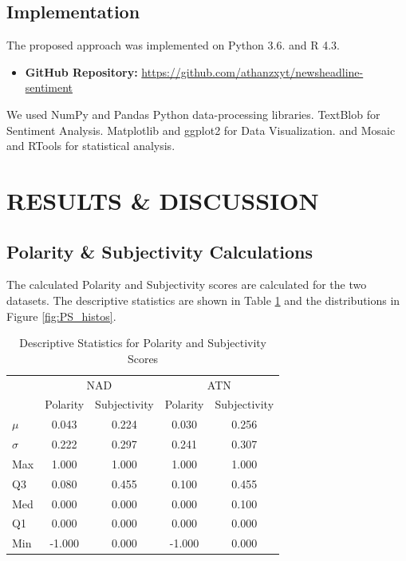 \documentclass[12pt]{article}
\begin{document}
\subsection{Implementation}

The proposed approach was implemented on Python 3.6. and R 4.3.

\begin{itemize}
    \item \textbf{GitHub Repository:} 
    \newline
    \url{https://github.com/athanzxyt/newsheadline-sentiment}
\end{itemize}

We used NumPy and Pandas Python data-processing libraries. TextBlob for Sentiment Analysis. Matplotlib and ggplot2 for Data Visualization. and Mosaic and RTools for statistical analysis.

\section{RESULTS \& DISCUSSION}

\subsection{Polarity \& Subjectivity Calculations}

The calculated Polarity and Subjectivity scores are calculated for the two datasets. The descriptive statistics are shown in Table \ref{lab:desc_stats} and the distributions in Figure \ref{fig:PS_histos}. 

\begin{table}[H]
    \centering
    \begin{tabular}{lcccc}
    \hline
                             & \multicolumn{2}{c}{NAD} & \multicolumn{2}{c}{ATN} \\
                             & Polarity & Subjectivity & Polarity & Subjectivity \\ \hline
    \multicolumn{1}{l|}{$\mu$}  & 0.043    & 0.224 & 0.030    & 0.256 \\
    \multicolumn{1}{l|}{$\sigma$}  & 0.222    & 0.297 & 0.241    & 0.307 \\
    \multicolumn{1}{l|}{Max} & 1.000    & 1.000 & 1.000    & 1.000 \\
    \multicolumn{1}{l|}{Q3}  & 0.080    & 0.455 & 0.100    & 0.455 \\
    \multicolumn{1}{l|}{Med} & 0.000   & 0.000 & 0.000    & 0.100 \\
    \multicolumn{1}{l|}{Q1}  & 0.000   & 0.000 & 0.000    & 0.000 \\
    \multicolumn{1}{l|}{Min} & -1.000       & 0.000 & -1.000       & 0.000 \\
    \hline
    \end{tabular}
    \caption{Descriptive Statistics for Polarity and Subjectivity Scores}
    \label{lab:desc_stats}
\end{table}
\end{document}
